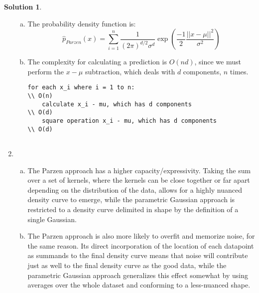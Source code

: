 \documentclass[letterpaper, 12pt]{article}
\theoremstyle{definition}
\newtheorem*{solution}{Solution}
\begin{document}
\begin{solution}
\begin{enumerate}[1.]
\begin{enumerate}[(a)]
                \item The probability density function is:
                	\begin{equation*}
                    	\hat{p}_{Parzen}(x) = \sum_{i = 1}^{n} \frac{1}{(2\pi)^{d/2}\sigma^{d}} \exp(\frac{-1}{2} \frac{||x - \mu||^2}{\sigma^2})
                    \end{equation*}
                    
                \item The complexity for calculating a prediction is $O(nd)$, since we must perform the $x - \mu$ subtraction, which deals with $d$ components, $n$ times.

                \begin{lstlisting}
for each x_i where i = 1 to n:											\\ O(n)
	calculate x_i - mu, which has d components						\\ O(d)
    square operation x_i - mu, which has d components				\\ O(d)
    
				\end{lstlisting}
                    
            \end{enumerate}
        
        \item %
        	\begin{enumerate}[(a)]
            	\item The Parzen approach has a higher capacity/expressivity. Taking the sum over a set of kernels, where the kernels can be close together or far apart depending on the distribution of the data, allows for a highly nuanced density curve to emerge, while the parametric Gaussian approach is restricted to a density curve delimited in shape by the definition of a single Gaussian.
                
                \item The Parzen approach is also more likely to overfit and memorize noise, for the same reason. Its direct incorporation of the location of each datapoint as summands to the final density curve means that noise will contribute just as well to the final density curve as the good data, while the parametric Gaussian approach generalizes this effect somewhat by using averages over the whole dataset and conforming to a less-nuanced shape.
                

\end{enumerate}
\end{enumerate}
\end{solution}
\end{document}
